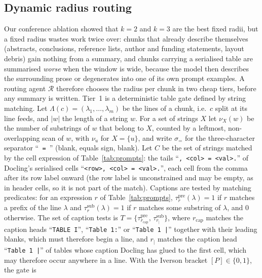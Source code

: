 \documentclass[pdflatex,sn-mathphys-num]{sn-jnl}
\theoremstyle{thmstyleone}%
\theoremstyle{thmstylethree}%
\begin{document}
\subsection{Dynamic radius routing}\label{sec:router}

Our conference ablation \cite{sandor2025documentslicecontextualretrieval} showed that $k=2$ and $k=3$ are the best fixed radii, but a fixed radius wastes work twice over: chunks that already describe themselves (abstracts, conclusions, reference lists, author and funding statements, layout debris) gain nothing from a summary, and chunks carrying a serialised table are summarised \emph{worse} when the window is wide, because the model then describes the surrounding prose or degenerates into one of its own prompt examples. A routing agent $\mathcal R$ therefore chooses the radius per chunk in two cheap tiers, before any summary is written. Tier~1 is a deterministic table gate defined by string matching. Let $\Lambda(c)=(\lambda_1,\dots,\lambda_m)$ be the lines of a chunk, i.e.\ $c$ split at its line feeds, and $|w|$ the length of a string $w$. For a set of strings $X$ let $\nu_X(w)$ be the number of substrings of $w$ that belong to $X$, counted by a leftmost, non-overlapping scan of $w$, with $\nu_u$ for $X=\{u\}$, and write $\sigma_{=}$ for the three-character separator ``\texttt{ = }'' (blank, equals sign, blank). Let $C$ be the set of strings matched by the cell expression of Table~\ref{tab:prompts}: the tails ``\texttt{, \textless col\textgreater{} = \textless val\textgreater.}'' of Docling's serialised cells ``\texttt{\textless row\textgreater, \textless col\textgreater{} = \textless val\textgreater.}'', each cell from the comma after its row label onward (the row label is unconstrained and may be empty, as in header cells, so it is not part of the match). Captions are tested by matching predicates: for an expression $r$ of Table~\ref{tab:prompts}, $\tau^{\mathrm{pre}}_{r}(\lambda)=1$ if $r$ matches a prefix of the line $\lambda$ and $\tau^{\mathrm{sub}}_{r}(\lambda)=1$ if $r$ matches some substring of $\lambda$, and $0$ otherwise. The set of caption tests is $T=\{\tau^{\mathrm{pre}}_{r_{\mathrm{cap}}},\,\tau^{\mathrm{sub}}_{r_{|}}\}$, where $r_{\mathrm{cap}}$ matches the caption heads ``\texttt{TABLE I}'', ``\texttt{Table 1:}'' or ``\texttt{Table 1 |}'' together with their leading blanks, which must therefore begin a line, and $r_{|}$ matches the caption head ``\texttt{Table 1 |}'' of tables whose caption Docling has glued to the first cell, which may therefore occur anywhere in a line. With the Iverson bracket $[P]\in\{0,1\}$, the gate is
\end{document}
